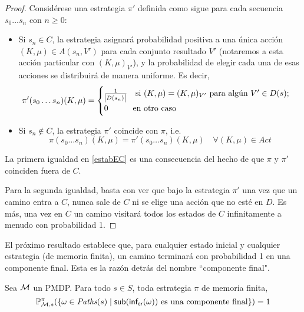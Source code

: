 \begin{proof}
	Considérese una estrategia $\pi'$ definida como sigue para cada secuencia $s_0 \dots s_n$ con $n \geq 0$:

	\begin{itemize}
		\item Si $s_n \in C$, la estrategia asignará probabilidad positiva a una única acción
		      $(K, \mu) \in A(s_n, V')$ para cada conjunto resultado $V'$ (notaremos a esta
		      acción particular con $(K, \mu)_{V'}$), y la probabilidad de elegir cada una de
		      esas acciones se distribuirá de manera uniforme. Es decir,
		      \[
			      \pi'(s_0 \dots s_n)(K, \mu) =
			      \begin{cases}
				      \frac{1}{\abs{D(s_n)}} \quad \text{si } (K, \mu) = (K, \mu)_{V'} \text{ para algún } V' \in D(s); \\
				      0 \qquad \quad \text{en otro caso}
			      \end{cases}
		      \]

		\item Si $s_n \notin C$, la estrategia $\pi'$ coincide con $\pi$, i.e.
		      \[
			      \pi(s_0 \dots s_n)(K, \mu) = \pi'(s_0\dots s_n)(K, \mu) \quad \forall (K, \mu) \in Act
		      \]

	\end{itemize}

	La primera igualdad en \ref{estabEC} es una consecuencia del hecho de que $\pi$
	y $\pi'$ coinciden fuera de $C$.

	Para la segunda igualdad, basta con ver que bajo la estrategia $\pi'$ una vez
	que un camino entra a $C$, nunca sale de $C$ ni se elige una acción que no esté
	en $D$. Es más, una vez en $C$ un camino visitará todos los estados de $C$
	infinitamente a menudo con probabilidad 1.
\end{proof}

El próximo resultado establece que, para cualquier estado inicial y cualquier
estrategia (de memoria finita), un camino terminará con probabilidad 1 en una
componente final. Esta es la razón detrás del nombre ``componente final".

\begin{theorem} \label{teoFundEC}
	Sea $\mathcal{M}$ un PMDP. Para todo $s \in S$, toda estrategia $\pi$ de memoria finita,
	$$\mathbb{P}^\pi_{\mathcal{M}, s}(\{ \omega \in \textit{Paths}(s) \mid \textsf{sub}(\textsf{inf}_\textsf{er}(\omega)) \text{ es una componente final}\}) = 1$$
\end{theorem}

